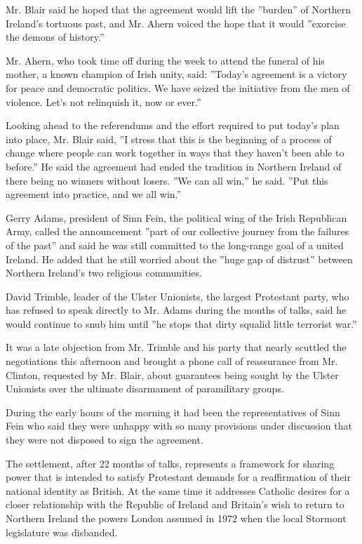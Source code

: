 Mr. Blair said he hoped that the agreement would lift the ''burden'' of
Northern Ireland's tortuous past, and Mr. Ahern voiced the hope that it
would ''exorcise the demons of history.''

Mr. Ahern, who took time off during the week to attend the funeral of
his mother, a known champion of Irish unity, said: ''Today's agreement
is a victory for peace and democratic politics. We have seized the
initiative from the men of violence. Let's not relinquish it, now or
ever.''

Looking ahead to the referendums and the effort required to put today's
plan into place, Mr. Blair said, ''I stress that this is the beginning
of a process of change where people can work together in ways that they
haven't been able to before.'' He said the agreement had ended the
tradition in Northern Ireland of there being no winners without losers.
''We can all win,'' he said. ''Put this agreement into practice, and we
all win.''

Gerry Adams, president of Sinn Fein, the political wing of the Irish
Republican Army, called the announcement ''part of our collective
journey from the failures of the past'' and said he was still committed
to the long-range goal of a united Ireland. He added that he still
worried about the ''huge gap of distrust'' between Northern Ireland's
two religious communities.

David Trimble, leader of the Ulster Unionists, the largest Protestant
party, who has refused to speak directly to Mr. Adams during the months
of talks, said he would continue to snub him until ''he stops that dirty
squalid little terrorist war.''

It was a late objection from Mr. Trimble and his party that nearly
scuttled the negotiations this afternoon and brought a phone call of
reassurance from Mr. Clinton, requested by Mr. Blair, about guarantees
being sought by the Ulster Unionists over the ultimate disarmament of
paramilitary groups.

During the early hours of the morning it had been the representatives of
Sinn Fein who said they were unhappy with so many provisions under
discussion that they were not disposed to sign the agreement.

The settlement, after 22 months of talks, represents a framework for
sharing power that is intended to satisfy Protestant demands for a
reaffirmation of their national identity as British. At the same time it
addresses Catholic desires for a closer relationship with the Republic
of Ireland and Britain's wish to return to Northern Ireland the powers
London assumed in 1972 when the local Stormont legislature was
disbanded.

